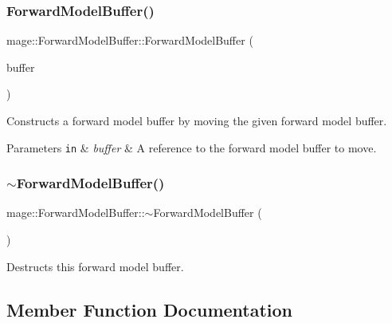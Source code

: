 \subsubsection{\texorpdfstring{Forward\+Model\+Buffer()}{ForwardModelBuffer()}\hspace{0.1cm}{\footnotesize\ttfamily [3/3]}}
{\footnotesize\ttfamily mage\+::\+Forward\+Model\+Buffer\+::\+Forward\+Model\+Buffer (\begin{DoxyParamCaption}\item[{\hyperlink{structmage_1_1_forward_model_buffer}{Forward\+Model\+Buffer} \&\&}]{buffer }\end{DoxyParamCaption})\hspace{0.3cm}{\ttfamily [default]}}

Constructs a forward model buffer by moving the given forward model buffer.


\begin{DoxyParams}[1]{Parameters}
\mbox{\tt in}  & {\em buffer} & A reference to the forward model buffer to move. \\
\hline
\end{DoxyParams}
\hypertarget{structmage_1_1_forward_model_buffer_ac8785bc5a7d271ee2a39bc0548293984}{}\label{structmage_1_1_forward_model_buffer_ac8785bc5a7d271ee2a39bc0548293984} 
\subsubsection{\texorpdfstring{$\sim$\+Forward\+Model\+Buffer()}{~ForwardModelBuffer()}}
{\footnotesize\ttfamily mage\+::\+Forward\+Model\+Buffer\+::$\sim$\+Forward\+Model\+Buffer (\begin{DoxyParamCaption}{ }\end{DoxyParamCaption})\hspace{0.3cm}{\ttfamily [default]}}

Destructs this forward model buffer. 

\subsection{Member Function Documentation}
\hypertarget{structmage_1_1_forward_model_buffer_a45eb0d2963ee6f2948fe2ca9072afb2a}{}\label{structmage_1_1_forward_model_buffer_a45eb0d2963ee6f2948fe2ca9072afb2a} 
